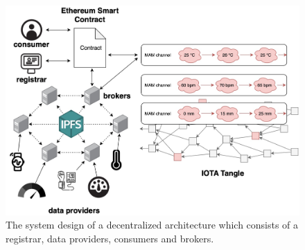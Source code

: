 \documentclass[journal,article,applsci,submit,moreauthors,pdftex]{Definitions/mdpi}
\begin{document}
\begin{figure}[h]
    \centering
    \includegraphics[width=3.3 in]{system_design}
    \caption{The system design of a decentralized architecture which consists of a registrar, data providers, consumers and brokers.}
    \label{fig:system_design}
\end{figure}
\end{document}
